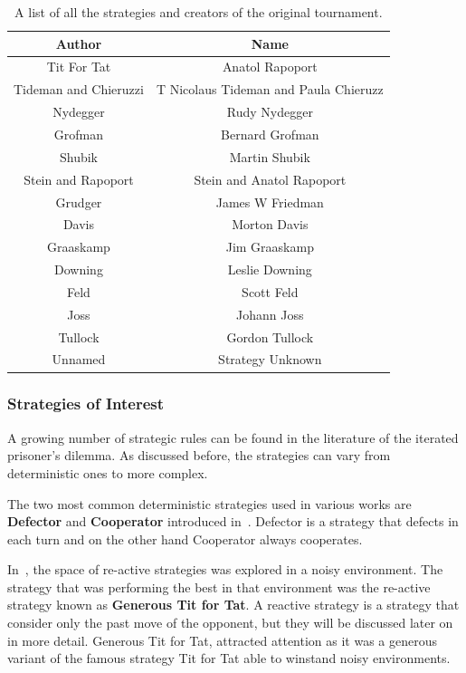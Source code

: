 \documentclass{article}
\begin{document}
\begin{table}[!hbtp]
    \begin{center}
        \begin{tabular}{cc}
        \toprule
        Author &  Name\\
        \midrule
        Tit For Tat	& Anatol Rapoport \\
        Tideman and Chieruzzi & T Nicolaus Tideman and Paula Chieruzz \\	
        Nydegger & Rudy Nydegger \\
        Grofman	& Bernard Grofman \\
        Shubik	& Martin Shubik \\
        Stein and Rapoport & Stein and Anatol Rapoport \\
        Grudger & James W Friedman \\
        Davis & Morton Davis \\
        Graaskamp & Jim Graaskamp \\
        Downing	& Leslie Downing \\
        Feld	& Scott Feld \\
        Joss	& Johann Joss \\
        Tullock	& Gordon Tullock \\
        Unnamed & Strategy	Unknown \\
        \bottomrule
        \end{tabular}
    \end{center}
\caption{A list of all the strategies and creators
of the original tournament.}\label{table:axelrods_strategies} 
\end{table}

\subsubsection{Strategies of Interest}
\label{subsection:deterministic_strategies}

A growing number of strategic rules can be found in the literature of the
iterated prisoner's dilemma. As discussed before, the strategies can vary from
deterministic ones to more complex.

The two most common deterministic strategies used in various works are
\textbf{Defector} and \textbf{Cooperator} introduced in~\cite{Axelrod1981}.
Defector is a strategy that defects in each turn and on the other hand Cooperator
always cooperates.

In~\cite{Nowak1990}, the space of re-active strategies was explored in a noisy
environment. The strategy that was performing the best in that environment was
the re-active strategy known as \textbf{Generous Tit for Tat}. A reactive 
strategy is a strategy that consider only the past move of the opponent, but 
they will be discussed later on in more detail. Generous Tit for Tat, attracted
attention as it was a generous variant of the famous strategy Tit for Tat able
to winstand noisy environments.
\end{document}
